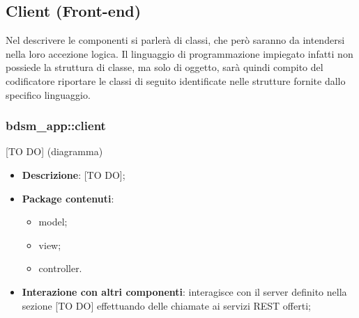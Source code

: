 %


\subsection{Client (Front-end)} %
\label{sub:client}
Nel descrivere le componenti si parlerà di classi, che però saranno da intendersi nella loro accezione logica. Il linguaggio di programmazione impiegato infatti non possiede la struttura di classe, ma solo di oggetto, sarà quindi compito del codificatore riportare le classi di seguito identificate nelle strutture fornite dallo specifico linguaggio.

	\subsubsection{bdsm\_app::client} %
	\label{ssub:bdsm_app_client}
	[TO DO] (diagramma) \newline \newline
	
	\begin{itemize}
		\item \textbf{Descrizione}: [TO DO];
		\item \textbf{Package contenuti}:
			\begin{itemize}
				\item model;
				\item view;
				\item controller.
			\end{itemize}
		\item \textbf{Interazione con altri componenti}: interagisce con il server definito nella sezione [TO DO] effettuando delle chiamate ai servizi REST offerti;
	\end{itemize}


